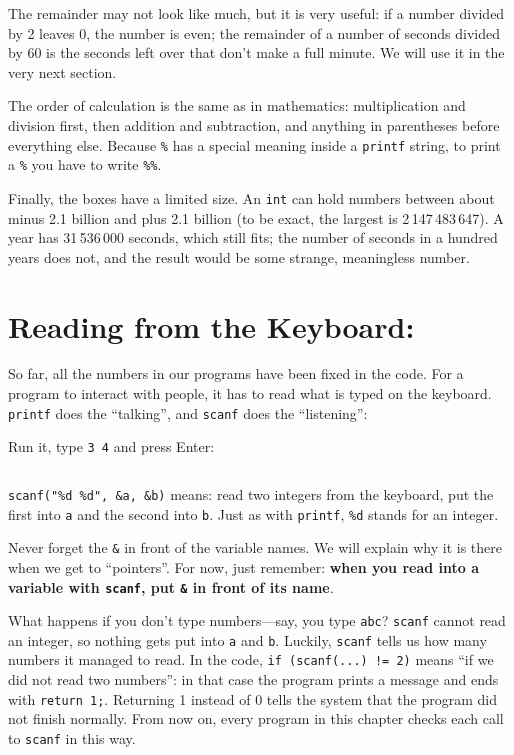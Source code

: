 The remainder may not look like much, but it is very useful: if a number divided by 2 leaves 0, the number is even; the remainder of a number of seconds divided by 60 is the seconds left over that don't make a full minute. We will use it in the very next section.

The order of calculation is the same as in mathematics: multiplication and division first, then addition and subtraction, and anything in parentheses before everything else. Because \texttt{\%} has a special meaning inside a \texttt{printf} string, to print a \texttt{\%} you have to write \texttt{\%\%}.

Finally, the boxes have a limited size. An \texttt{int} can hold numbers between about minus 2.1 billion and plus 2.1 billion (to be exact, the largest is 2\,147\,483\,647). A year has 31\,536\,000 seconds, which still fits; the number of seconds in a hundred years does not, and the result would be some strange, meaningless number.

\section{Reading from the Keyboard: \texorpdfstring{}{scanf}}
\label{sec:scanf}

So far, all the numbers in our programs have been fixed in the code. For a program to interact with people, it has to read what is typed on the keyboard. \texttt{printf} does the ``talking'', and \texttt{scanf} does the ``listening'':


Run it, type \texttt{3 4} and press Enter:
\inputminted[linenos=false]{text}{code/en/ch02/out/add.txt}

\texttt{scanf("\%d \%d", \&a, \&b)} means: read two integers from the keyboard, put the first into \texttt{a} and the second into \texttt{b}. Just as with \texttt{printf}, \texttt{\%d} stands for an integer.

Never forget the \texttt{\&} in front of the variable names. We will explain why it is there when we get to ``pointers''. For now, just remember: \textbf{when you read into a variable with \texttt{scanf}, put \texttt{\&} in front of its name}.

What happens if you don't type numbers---say, you type \texttt{abc}? \texttt{scanf} cannot read an integer, so nothing gets put into \texttt{a} and \texttt{b}. Luckily, \texttt{scanf} tells us how many numbers it managed to read. In the code, \texttt{if (scanf(...) != 2)} means ``if we did not read two numbers'': in that case the program prints a message and ends with \texttt{return 1;}. Returning 1 instead of 0 tells the system that the program did not finish normally. From now on, every program in this chapter checks each call to \texttt{scanf} in this way.

